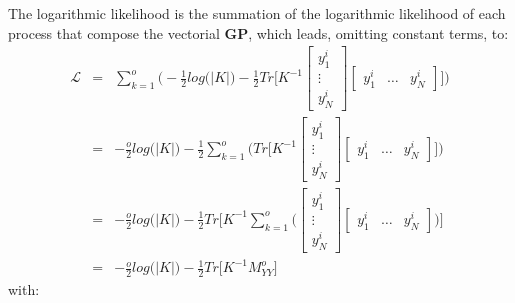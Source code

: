 \documentclass{article}
\begin{document}
The logarithmic likelihood is the summation of the logarithmic likelihood of each process that compose the vectorial \textbf{GP}, which leads, omitting constant terms, to:
\begin{eqnarray}
\mathcal{L} &=& 
\sum_{k=1}^o \bigg (
-\frac{1}{2} log \big (\left | K \right | \big )
-\frac{1}{2} Tr \bigg [
K^{-1} 
\begin{bmatrix} y^i_1 \\ \vdots \\ y^i_N \end{bmatrix}
\begin{bmatrix} y^i_1 & \hdots & y^i_N \end{bmatrix}
\bigg ] \bigg )  \\
&=&
-\frac{o}{2} log \big (\left | K \right | \big )
-\frac{1}{2} \sum_{k=1}^o \bigg ( Tr \bigg [
K^{-1} 
\begin{bmatrix} y^i_1 \\ \vdots \\ y^i_N \end{bmatrix}
\begin{bmatrix} y^i_1 & \hdots & y^i_N \end{bmatrix}
\bigg ] 
\bigg ) \\
&=&
-\frac{o}{2} log \big (\left | K \right | \big )
-\frac{1}{2} Tr \bigg [
K^{-1} \sum_{k=1}^o \bigg (
\begin{bmatrix} y^i_1 \\ \vdots \\ y^i_N \end{bmatrix}
\begin{bmatrix} y^i_1 & \hdots & y^i_N \end{bmatrix}
\bigg )
\bigg ] \\
&=&
-\frac{o}{2} log \big (\left | K \right | \big )
-\frac{1}{2} Tr \bigg [
K^{-1} M^o_{YY}
\bigg ] 
\end{eqnarray}
with:
\end{document}
